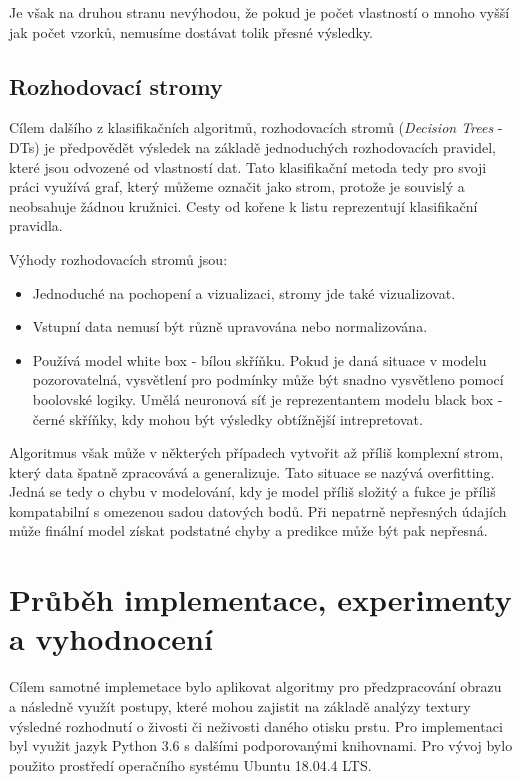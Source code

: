 Je však na druhou stranu nevýhodou, že pokud je počet vlastností o mnoho vyšší jak počet vzorků, nemusíme dostávat tolik přesné výsledky. 

\section{Rozhodovací stromy}
Cílem dalšího z klasifikačních algoritmů, rozhodovacích stromů (\textit{Decision Trees} - DTs) je předpovědět výsledek na základě jednoduchých rozhodovacích pravidel, které jsou odvozené od vlastností dat. Tato klasifikační metoda tedy pro svoji práci využívá graf, který můžeme označit jako strom, protože je souvislý a neobsahuje žádnou kružnici. Cesty od kořene k listu reprezentují klasifikační pravidla. 

Výhody rozhodovacích stromů jsou:\cite{ScikitDTs}
\begin{itemize}
    \item Jednoduché na pochopení a vizualizaci, stromy jde také vizualizovat.
    \item Vstupní data nemusí být různě upravována nebo normalizována.
    \item Používá model white box - bílou skříňku. Pokud je daná situace v modelu pozorovatelná, vysvětlení pro podmínky může být snadno vysvětleno pomocí boolovské logiky. Umělá neuronová síť je reprezentantem modelu black box - černé skříňky, kdy mohou být výsledky obtížnější intrepretovat. 
\end{itemize}


Algoritmus však může v některých případech vytvořit až příliš komplexní strom, který data špatně zpracovává a generalizuje. Tato situace se nazývá overfitting. Jedná se tedy o chybu v modelování, kdy je model příliš složitý a fukce je příliš kompatabilní s omezenou sadou datových bodů. Při nepatrně nepřesných údajích může finální model získat podstatné chyby a predikce může být pak nepřesná.
    
\chapter{Průběh implementace, experimenty a vyhodnocení}
Cílem samotné implemetace bylo aplikovat algoritmy pro předzpracování obrazu a následně využít postupy, které mohou zajistit na základě analýzy textury výsledné rozhodnutí o živosti či neživosti daného otisku prstu.
Pro implementaci byl využit jazyk Python 3.6 s dalšími podporovanými knihovnami. Pro vývoj bylo použito prostředí operačního systému Ubuntu 18.04.4 LTS.

